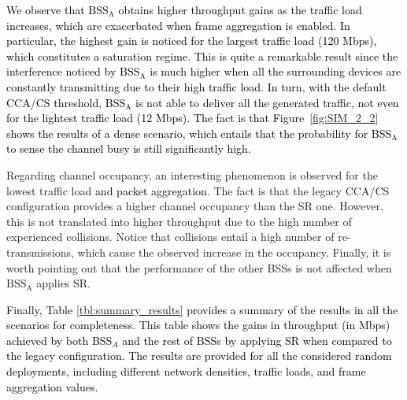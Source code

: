 \documentclass[preprint,12pt]{elsarticle}
\theoremstyle{plain}
\begin{document}
\textcolor{black}{We observe that $\text{BSS}_\text{A}$ obtains higher throughput gains as the traffic load increases, which are exacerbated when frame aggregation is enabled. In particular, the highest gain is noticed for the largest traffic load (120 Mbps), which constitutes a saturation regime. This is quite a remarkable result since the interference noticed by $\text{BSS}_\text{A}$ is much higher when all the surrounding devices are constantly transmitting due to their high traffic load. In turn, with the default CCA/CS threshold, BSS$_\text{A}$ is not able to deliver all the generated traffic, not even for the lightest traffic load (12 Mbps). The fact is that Figure~\ref{fig:SIM_2_2} shows the results of a dense scenario, which entails that the probability for BSS$_\text{A}$ to sense the channel busy is still significantly high.}

Regarding channel occupancy, an interesting phenomenon is observed for the lowest traffic load \textcolor{black}{and packet aggregation}. The fact is that the legacy CCA/CS configuration provides a higher channel occupancy than the SR one. However, this is not translated into higher throughput due to the high number of experienced collisions. Notice that collisions entail a high number of re-transmissions, which cause the observed increase in the occupancy. Finally, it is worth pointing out that the performance of the other BSSs is not affected when $\text{BSS}_\text{A}$ applies SR.

\textcolor{black}{Finally, Table \ref{tbl:summary_results} provides a summary of the results in all the scenarios for completeness. This table shows the gains in throughput (in Mbps) achieved by both BSS$_A$ and the rest of BSSs by applying SR  when compared to the legacy configuration. The results are provided for all the considered random deployments, including different network densities, traffic loads, and frame aggregation values.}
\end{document}
